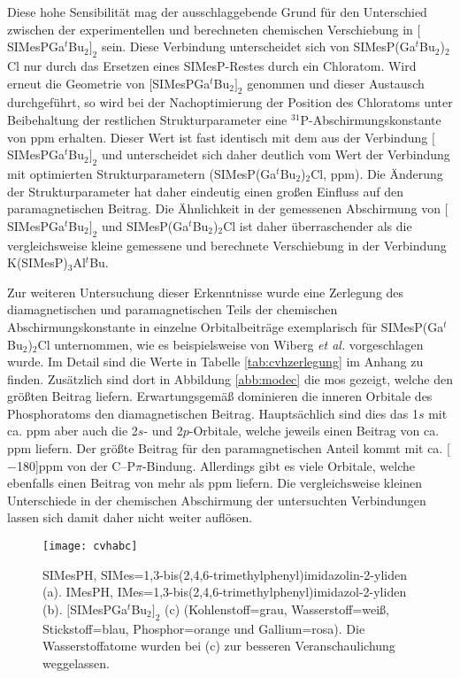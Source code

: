 Diese hohe Sensibilität mag der ausschlaggebende Grund für den Unterschied zwischen der experimentellen und berechneten chemischen Verschiebung in $[$SIMesPGa$^\textit{t}$Bu$_2]_2$ sein. Diese Verbindung unterscheidet sich von SIMesP(Ga$^\textit{t}$Bu$_2$)$_2$Cl nur durch das Ersetzen eines SIMesP-Restes durch ein Chloratom. Wird erneut die Geometrie von $[$SIMesPGa$^\textit{t}$Bu$_2]_2$ genommen und dieser Austausch durchgeführt, so wird bei der Nachoptimierung der Position des Chloratoms unter Beibehaltung der restlichen Strukturparameter eine $^{31}$P-Abschirmungskonstante von \unit[336]{ppm} erhalten. Dieser Wert ist fast identisch mit dem aus der Verbindung $[$SIMesPGa$^\textit{t}$Bu$_2]_2$ und unterscheidet sich daher deutlich vom Wert der Verbindung mit optimierten Strukturparametern (SIMesP(Ga$^\textit{t}$Bu$_2$)$_2$Cl, \unit[380]{ppm}). Die Änderung der Strukturparameter hat daher eindeutig einen großen Einfluss auf den paramagnetischen Beitrag. Die Ähnlichkeit in der gemessenen Abschirmung von $[$SIMesPGa$^\textit{t}$Bu$_2]_2$ und SIMesP(Ga$^\textit{t}$Bu$_2$)$_2$Cl ist daher überraschender als die vergleichsweise kleine gemessene und berechnete Verschiebung in der Verbindung K(SIMesP)$_3$Al$^\textit{t}$Bu.

Zur weiteren Untersuchung dieser Erkenntnisse wurde eine Zerlegung des diamagnetischen und paramagnetischen Teils der chemischen Abschirmungskonstante in einzelne Orbitalbeiträge exemplarisch für SIMesP(Ga$^\textit{t}$Bu$_2$)$_2$Cl unternommen, wie es beispielsweise von Wiberg \textit{et al.}\supercite{wiberg1998nmr} vorgeschlagen wurde. Im Detail sind die Werte in Tabelle \ref{tab:cvhzerlegung} im Anhang zu finden. Zusätzlich sind dort in Abbildung \ref{abb:modec} die \acp{mo} gezeigt, welche den größten Beitrag liefern. Erwartungsgemäß dominieren die inneren Orbitale des Phosphoratoms den diamagnetischen Beitrag. Hauptsächlich sind dies das 1$s$ mit ca. \unit[500]{ppm} aber auch die 2$s$- und 2$p$-Orbitale, welche jeweils einen Beitrag von ca. \unit[100]{ppm} liefern. Der größte Beitrag für den paramagnetischen Anteil kommt mit ca. \unit[$-$180]{ppm} von der C--P$\pi$-Bindung. Allerdings gibt es viele Orbitale, welche ebenfalls einen Beitrag von mehr als \unit[10]{ppm} liefern. Die vergleichsweise kleinen Unterschiede in der chemischen Abschirmung der untersuchten Verbindungen lassen sich damit daher nicht weiter auflösen.

\begin{figure}[ht!]
	\centering
	\texttt{[image: cvhabc]}
	\captionsetup{figurewithin = chapter}
	\captionsetup{font=small, labelfont=bf}\caption[{Abbildung von SIMesPH, IMesPH und $[$SIMesPGa$^\textit{t}$Bu$_2]_2$}]{ SIMesPH, SIMes=1,3-bis(2,4,6-tri\-me\-thyl\-phe\-nyl)imi\-da\-zo\-lin-2-yli\-den (a). IMesPH, IMes=1,3-bis(2,4,6-tri\-me\-thyl\-phe\-nyl)imi\-da\-zol-2-yli\-den (b). $[$SIMesPGa$^\textit{t}$Bu$_2]_2$ (c) (Kohlenstoff=grau, Wasserstoff=weiß, Stickstoff=blau, Phosphor=orange und Gallium=rosa). Die Wasserstoffatome wurden bei (c) zur besseren Veranschaulichung weggelassen.}
\label{abb:cvhabc}
\end{figure}


